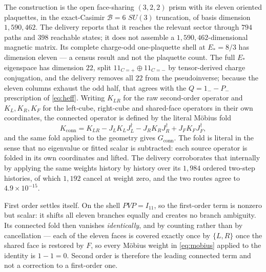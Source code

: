 \documentclass[11pt]{article}
\theoremstyle{plain}
\theoremstyle{definition}
\theoremstyle{remark}
\newcommand{\chk}[1]{}
\newcommand{\dg}{^{\dagger}}
\begin{document}
The construction is the open face-sharing $(3,2,2)$ prism with its eleven
oriented plaquettes, in the exact-Casimir $\mathcal B=6$ $SU(3)$ truncation, of
basis dimension $1{,}590{,}462$. The delivery reports that it reaches the
relevant sector through $794$ paths and $398$ reachable states; it does not
assemble a $1{,}590{,}462$-dimensional magnetic matrix. Its complete
charge-odd one-plaquette shell at
$E_*=8/3$ has dimension eleven --- a census result and not the plaquette count.
The full $E_*$ eigenspace has dimension $22$, split $11_{C=+}\oplus11_{C=-}$ by
tensor-derived charge conjugation, and the delivery removes all $22$ from the
pseudoinverse; because the eleven columns exhaust the odd half, that agrees
with the $Q=1_--P_-$ prescription of \eqref{eq:heff}. Writing $K_{LR}$ for the raw second-order
operator and $K_L,K_R,K_F$ for the left-cube, right-cube and shared-face
operators in their own coordinates, the connected operator is defined by the
literal M\"obius fold
\begin{equation}\label{eq:mobius}
  K_{\mathrm{conn}}=K_{LR}-J_LK_LJ_L\dg-J_RK_RJ_R\dg+J_FK_FJ_F\dg ,
\end{equation}
and the same fold applied to the geometry gives $G_{\mathrm{conn}}$. The fold
is literal in the sense that no eigenvalue or fitted scalar is subtracted: each
source operator is folded in its own coordinates and lifted. The delivery
corroborates that internally by applying the same weights history by history
over its $1{,}984$ ordered two-step histories, of which $1{,}192$ cancel at
weight zero, and the two routes agree to $4.9\times10^{-15}$.

First order settles itself. On the shell $PVP=I_{11}$, so the first-order term
is nonzero but scalar: it shifts all eleven branches equally and creates no
branch ambiguity. Its connected fold then vanishes \emph{identically}, and by
counting rather than by cancellation --- each of the eleven faces is covered
exactly once by $\{L,R\}$ once the shared face is restored by $F$, so every
M\"obius weight in \eqref{eq:mobius} applied to the identity is $1-1=0$.
Second order is therefore the leading connected term and not a correction to a
first-order one.
\chk{connected first order vanishes by inclusion-exclusion, not by cancellation of numbers}
\end{document}
